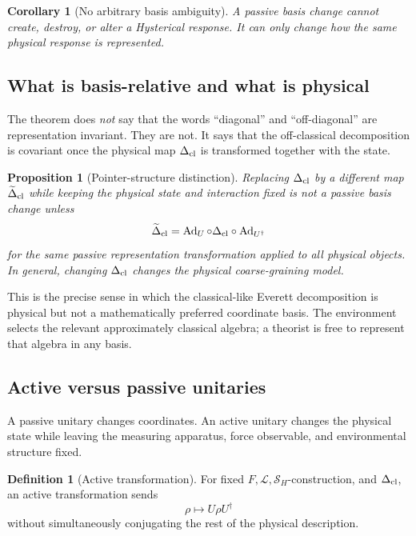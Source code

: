 \documentclass[11pt]{article}
\newtheorem{corollary}[theorem]{Corollary}
\newtheorem{proposition}[theorem]{Proposition}
\theoremstyle{definition}
\newtheorem{definition}[theorem]{Definition}
\theoremstyle{remark}
\newcommand{\Ad}{\operatorname{Ad}}
\begin{document}
\begin{corollary}[No arbitrary basis ambiguity]
A passive basis change cannot create, destroy, or alter a Hysterical response. It can only change how the same physical response is represented.
\end{corollary}

\subsection{What is basis-relative and what is physical}
The theorem does \emph{not} say that the words ``diagonal'' and ``off-diagonal'' are representation invariant. They are not. It says that the off-classical decomposition is covariant once the physical map $\Delta_{\rm cl}$ is transformed together with the state.

\begin{proposition}[Pointer-structure distinction]
Replacing $\Delta_{\rm cl}$ by a different map $\widetilde\Delta_{\rm cl}$ while keeping the physical state and interaction fixed is not a passive basis change unless
\begin{equation}
 \widetilde\Delta_{\rm cl}=\Ad_U\circ\Delta_{\rm cl}\circ\Ad_{U^\dagger}
\end{equation}
for the same passive representation transformation applied to all physical objects. In general, changing $\Delta_{\rm cl}$ changes the physical coarse-graining model.
\end{proposition}

This is the precise sense in which the classical-like Everett decomposition is physical but not a mathematically preferred coordinate basis. The environment selects the relevant approximately classical algebra; a theorist is free to represent that algebra in any basis.

\subsection{Active versus passive unitaries}
A passive unitary changes coordinates. An active unitary changes the physical state while leaving the measuring apparatus, force observable, and environmental structure fixed.

\begin{definition}[Active transformation]
For fixed $F,\mathcal L,\mathcal S_H$-construction, and $\Delta_{\rm cl}$, an active transformation sends
\begin{equation}
 \rho\mapsto U\rho U^\dagger
\end{equation}
without simultaneously conjugating the rest of the physical description.
\end{definition}
\end{document}
